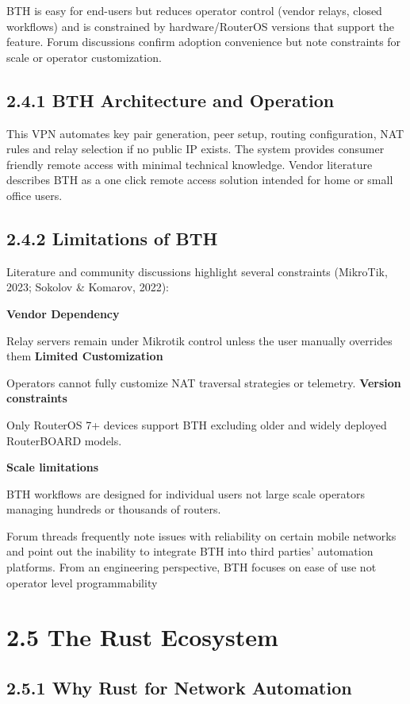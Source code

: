 \documentclass[12pt,a4paper,oneside]{report}
\begin{document}
BTH is easy for end-users but reduces operator control (vendor relays, closed workflows) and is constrained by hardware/RouterOS versions that support the feature. Forum discussions confirm adoption convenience but note constraints for scale or operator customization.


\subsection{2.4.1 BTH Architecture and Operation}

This VPN automates key pair generation, peer setup, routing configuration, NAT rules and relay selection if no public IP exists. The system provides consumer friendly remote access with minimal technical knowledge. Vendor literature describes BTH as a one click remote access solution intended for home or small office users.


\subsection{2.4.2 Limitations of BTH}

Literature and community discussions highlight several constraints (MikroTik, 2023; Sokolov \& Komarov, 2022):


\textbf{Vendor Dependency}


Relay servers remain under Mikrotik control unless the user manually overrides them \textbf{Limited Customization}


Operators cannot fully customize NAT traversal strategies or telemetry. \textbf{Version constraints}


Only RouterOS 7+ devices support BTH excluding older and widely deployed RouterBOARD models.


\textbf{Scale limitations}


BTH workflows are designed for individual users not large scale operators managing hundreds or thousands of routers.


Forum threads frequently note issues with reliability on certain mobile networks and point out the inability to integrate BTH into third parties' automation platforms. From an engineering perspective, BTH focuses on ease of use not operator level programmability


\section{2.5 The Rust Ecosystem}

\subsection{2.5.1 Why Rust for Network Automation}
\end{document}
